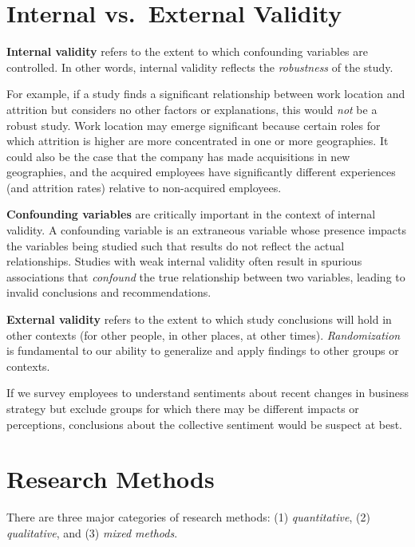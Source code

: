 \documentclass[]{book}
\begin{document}
\hypertarget{internal-vs.external-validity}{%
\section{Internal vs.~External Validity}\label{internal-vs.external-validity}}

\textbf{Internal validity} refers to the extent to which confounding variables are controlled. In other words, internal validity reflects the \emph{robustness} of the study.

For example, if a study finds a significant relationship between work location and attrition but considers no other factors or explanations, this would \emph{not} be a robust study. Work location may emerge significant because certain roles for which attrition is higher are more concentrated in one or more geographies. It could also be the case that the company has made acquisitions in new geographies, and the acquired employees have significantly different experiences (and attrition rates) relative to non-acquired employees.

\textbf{Confounding variables} are critically important in the context of internal validity. A confounding variable is an extraneous variable whose presence impacts the variables being studied such that results do not reflect the actual relationships. Studies with weak internal validity often result in spurious associations that \emph{confound} the true relationship between two variables, leading to invalid conclusions and recommendations.

\textbf{External validity} refers to the extent to which study conclusions will hold in other contexts (for other people, in other places, at other times). \emph{Randomization} is fundamental to our ability to generalize and apply findings to other groups or contexts.

If we survey employees to understand sentiments about recent changes in business strategy but exclude groups for which there may be different impacts or perceptions, conclusions about the collective sentiment would be suspect at best.

\hypertarget{research-methods}{%
\section{Research Methods}\label{research-methods}}

There are three major categories of research methods: (1) \emph{quantitative}, (2) \emph{qualitative}, and (3) \emph{mixed methods}.
\end{document}
